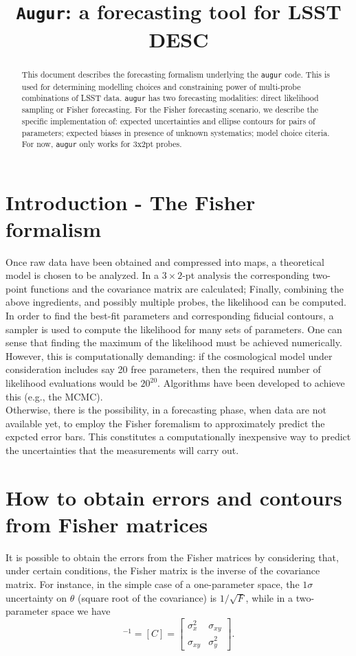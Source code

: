 \documentclass[modern]{lsstdescnote}
\begin{document}
\title{{\tt Augur}: a forecasting tool for LSST DESC}

\maketitlepre

\begin{abstract}
  This document describes the forecasting formalism underlying the {\tt augur} code. This is used for determining modelling choices and constraining power of multi-probe combinations of LSST data.
  {\tt augur} has two forecasting modalities: direct likelihood sampling or Fisher forecasting.
  For the Fisher forecasting scenario, we describe the specific implementation of: expected uncertainties and ellipse contours for pairs of parameters; expected biases in presence of unknown systematics; model choice citeria.
  For now, {\tt augur} only works for 3x2pt probes.
\end{abstract}

\maketitlepost

\newpage
\tableofcontents{}
\newpage


\section{Introduction - The Fisher formalism}
Once raw data have been obtained and compressed into maps, a theoretical model is chosen 
to be analyzed. In a $3\times 2$-pt analysis the corresponding two-point functions and the covariance matrix are calculated;
Finally, combining the above ingredients, and possibly multiple probes, the likelihood can be computed.
In order to find the best-fit parameters and corresponding fiducial contours, a sampler is used to compute the likelihood 
for many sets of parameters. One can sense that finding the maximum of the likelihood must be achieved numerically.
However, this is computationally demanding: if the cosmological model under consideration includes say 20 free parameters,
then the required number of likelihood evaluations would be $20^{20}$. Algorithms have been developed to achieve this (e.g., the MCMC).\\
Otherwise, there is the possibility, in a forecasting phase, when data are not available yet, to employ the Fisher 
foremalism to approximately predict the expcted error bars. This constitutes a computationally inexpensive way
to predict the uncertainties that the measurements will carry out.

\section{How to obtain errors and contours from Fisher matrices}
It is possible to obtain the errors from the Fisher matrices by considering that, under certain conditions,
the Fisher matrix is the inverse of the covariance matrix.
For instance, in the simple case of a one-parameter space, the $1\sigma$ uncertainty on $\theta$ (square root of the covariance) is $1/\sqrt{F}$, while in a two-parameter space we have 
\begin{equation}
[F]^{-1}=[C]=\left[\begin{array}{cc}
\sigma_{x}^{2} & \sigma_{x y} \\
\sigma_{x y} & \sigma_{y}^{2}
\end{array}\right].
\end{equation}
\end{document}
